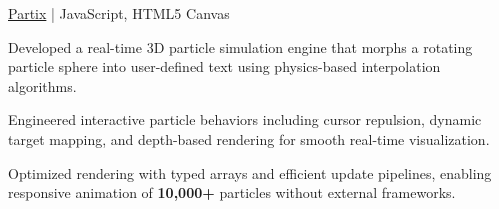 \begin{cvproject}{\href{https://github.com/grvsnh/partix}{Partix} | JavaScript, HTML5 Canvas}{}
    \item Developed a real-time 3D particle simulation engine that morphs a rotating particle sphere into user-defined text using physics-based interpolation algorithms.
    \item Engineered interactive particle behaviors including cursor repulsion, dynamic target mapping, and depth-based rendering for smooth real-time visualization.
    \item Optimized rendering with typed arrays and efficient update pipelines, enabling responsive animation of \textbf{10,000+} particles without external frameworks.
\end{cvproject}
